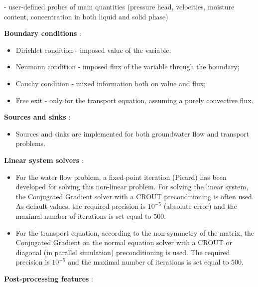\begin{list}{-}{}
\begin{itemize}
\begin{list}
 - user-defined probes of main quantities (pressure head, velocities, moisture content, concentration in both liquid and solid phase)
\end{list}
\end {itemize}
\vspace{5pt}
% 
\item[$\bullet$] \textbf{Boundary conditions} :
  \begin {itemize}
    \item [-] Dirichlet condition - imposed value of the variable;
    \item [-] Neumann condition - imposed flux of the variable through the boundary;
    \item [-] Cauchy condition - mixed information both on value and flux;
    \item [-] Free exit - only for the transport equation, assuming a purely convective flux.
  \end{itemize}
 \vspace{5pt}
%
\item[$\bullet$] \textbf{Sources and sinks} :
%
  \begin {itemize}
    \item [-] Sources and sinks are implemented for both groundwater flow and transport problems.
  \end{itemize}
 \vspace{5pt}
%
\item[$\bullet$] \textbf{Linear system solvers} :
%
  \begin {itemize}
    \item [-] For the water flow problem, a fixed-point iteration (Picard) has been developed for solving this non-linear problem. For solving the linear system, the Conjugated Gradient solver with a CROUT preconditioning is often used. As default values, the required precision is $10^{-5}$ (absolute error) and the maximal number of iterations is set equal to $500$.
    \item [-] For the transport equation, according to the non-symmetry of the matrix, the Conjugated Gradient on the normal equation solver with a CROUT or diagonal (in parallel simulation) preconditioning is used. The required precision is $10^{-5}$ and the maximal number of iterations is set equal to $500$.
  \end{itemize}
% 
\item[$\bullet$] \textbf{Post-processing features} :
%
  \begin {itemize}

\end{itemize}
\end{list}
